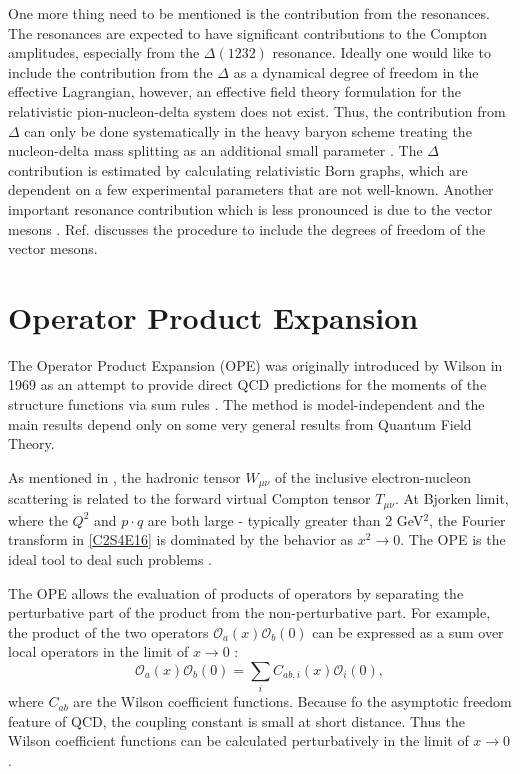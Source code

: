 One more thing need to be mentioned is the contribution from the resonances. The resonances are expected to have significant contributions to the Compton amplitudes, especially from the $\Delta(1232)$ resonance. Ideally one would like to include the contribution from the $\Delta$ as a dynamical degree of freedom in the effective Lagrangian, however, an effective field theory formulation for the relativistic pion-nucleon-delta system does not exist. Thus, the contribution from $\Delta$ can only be done systematically in the heavy baryon scheme treating the nucleon-delta mass splitting as an additional small parameter \cite{Hemmert1998}. The $\Delta$ contribution is estimated by calculating relativistic Born graphs, which are dependent on a few experimental parameters that are not well-known. Another important resonance contribution which is less pronounced is due to the vector mesons \cite{Bernard2003}. Ref. \cite{Kubis2001} discusses the procedure to include the degrees of freedom of the vector mesons.

\section{Operator Product Expansion}
\label{C3S2}

The Operator Product Expansion (OPE) was originally introduced by Wilson in 1969 as an attempt to provide direct QCD predictions for the moments of the structure functions via sum rules \cite{Wilson1969}. The method is model-independent and the main results depend only on some very general results from Quantum Field Theory.

As mentioned in , the hadronic tensor $W_{\mu\nu}$ of the inclusive electron-nucleon scattering is related to the forward virtual Compton tensor $T_{\mu\nu}$. At Bjorken limit, where the $Q^2$ and $p\cdot q$ are both large - typically greater than 2 GeV${}^2$, the Fourier transform in \cref{C2S4E16} is dominated by the behavior as $x^2\rightarrow 0$. The OPE is the ideal tool to deal such problems \cite{Thomas2001}.

The OPE allows the evaluation of products of operators by separating the perturbative part of the product from the non-perturbative part. For example, the product of the two operators $\mathcal{O}_a(x)\mathcal{O}_b(0)$ can be expressed as a sum over local operators in the limit of $x\rightarrow 0$ \cite{Manohar1992}:
\begin{equation} \label{C3S2E1}
\mathcal{O}_a(x)\mathcal{O}_b(0) = \sum_iC_{ab,i}(x)\mathcal{O}_i(0),
\end{equation}
where $C_{ab}$ are the Wilson coefficient functions. Because fo the asymptotic freedom feature of QCD, the coupling constant is small at short distance. Thus the Wilson coefficient functions can be calculated perturbatively in the limit of $x\rightarrow 0$.

